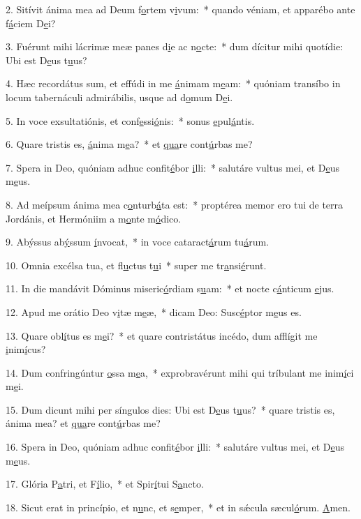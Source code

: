 2. Sitívit ánima mea ad Deum f\uline{o}rtem v\uline{i}vum:~* quando véniam, et apparébo ante f\uline{á}ciem D\uline{e}i?\par 
3. Fuérunt mihi lácrimæ meæ panes d\uline{i}e ac n\uline{o}cte:~* dum dícitur mihi quotídie: Ubi est D\uline{e}us t\uline{u}us?\par 
4. Hæc recordátus sum, et effúdi in me \uline{á}nimam m\uline{e}am:~* quóniam transíbo in locum tabernáculi admirábilis, usque ad d\uline{o}mum D\uline{e}i.\par 
5. In voce exsultatiónis, et conf\uline{e}ssi\uline{ó}nis:~* sonus \uline{e}pul\uline{á}ntis.\par 
6. Quare tristis es, \uline{á}nima m\uline{e}a?~* et \uline{qua}re cont\uline{ú}rbas me?\par 
7. Spera in Deo, quóniam adhuc confit\uline{é}bor \uline{i}lli:~* salutáre vultus mei, et D\uline{e}us m\uline{e}us.\par 
8. Ad meípsum ánima mea c\uline{o}nturb\uline{á}ta est:~* proptérea memor ero tui de terra Jordánis, et Hermóniim a m\uline{o}nte m\uline{ó}dico.\par 
9. Abýssus ab\uline{ý}ssum \uline{í}nvocat,~* in voce cataract\uline{á}rum tu\uline{á}rum.\par 
10. Omnia excélsa tua, et fl\uline{u}ctus t\uline{u}i~* super me tr\uline{a}nsi\uline{é}runt.\par 
11. In die mandávit Dóminus miseric\uline{ó}rdiam s\uline{u}am:~* et nocte c\uline{á}nticum \uline{e}jus.\par 
12. Apud me orátio Deo v\uline{i}tæ m\uline{e}æ,~* dicam Deo: Susc\uline{é}ptor m\uline{e}us es.\par 
13. Quare obl\uline{í}tus es m\uline{e}i?~* et quare contristátus incédo, dum afflígit me \uline{i}nim\uline{í}cus?\par 
14. Dum confringúntur \uline{o}ssa m\uline{e}a,~* exprobravérunt mihi qui tríbulant me inim\uline{í}ci m\uline{e}i.\par 
15. Dum dicunt mihi per síngulos dies: Ubi est D\uline{e}us t\uline{u}us?~* quare tristis es, ánima mea? et \uline{qua}re cont\uline{ú}rbas me?\par 
16. Spera in Deo, quóniam adhuc confit\uline{é}bor \uline{i}lli:~* salutáre vultus mei, et D\uline{e}us m\uline{e}us.\par 
17. Glória P\uline{a}tri, et F\uline{í}lio,~* et Spir\uline{í}tui S\uline{a}ncto.\par 
18. Sicut erat in princípio, et n\uline{u}nc, et s\uline{e}mper,~* et in sǽcula sæcul\uline{ó}rum. \uline{A}men.\par 
